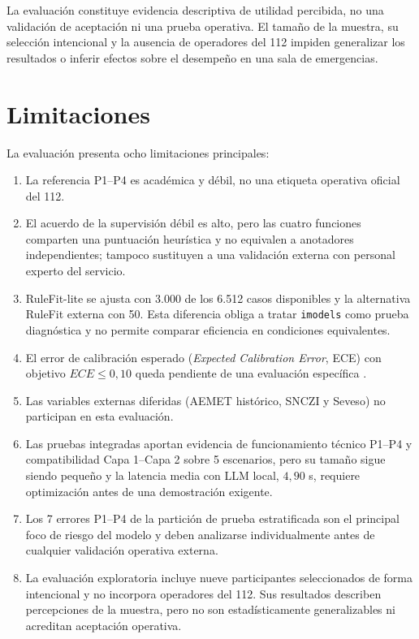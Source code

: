 La evaluación constituye evidencia descriptiva de utilidad percibida, no una validación
de aceptación ni una prueba operativa. El tamaño de la muestra, su selección intencional
y la ausencia de operadores del 112 impiden generalizar los resultados o inferir
efectos sobre el desempeño en una sala de emergencias.

\section{Limitaciones}

La evaluación presenta ocho limitaciones principales:

\begin{enumerate}
    \item La referencia P1--P4 es académica y débil, no una etiqueta operativa oficial
    del 112.
    \item El acuerdo de la supervisión débil es alto, pero las cuatro funciones comparten
    una puntuación heurística y no equivalen a anotadores independientes; tampoco sustituyen
    a una validación externa con personal experto del servicio.
    \item RuleFit-lite se ajusta con 3.000 de los 6.512 casos disponibles y la alternativa
    RuleFit externa con 50. Esta diferencia obliga a tratar \texttt{imodels} como prueba
    diagnóstica y no permite comparar eficiencia en condiciones equivalentes.
    \item El error de calibración esperado (\textit{Expected Calibration Error}, ECE)
    con objetivo \(ECE \leq 0{,}10\) queda pendiente de una evaluación específica
    \cite{Guo2017Calibration}.
    \item Las variables externas diferidas (AEMET histórico, SNCZI y Seveso)
    no participan en esta evaluación.
    \item Las pruebas integradas aportan evidencia de funcionamiento técnico P1--P4 y
    compatibilidad Capa 1--Capa 2 sobre 5 escenarios, pero su tamaño sigue siendo pequeño y la
    latencia media con LLM local, \(4{,}90\) s, requiere optimización antes de una
    demostración exigente.
    \item Los 7 errores P1--P4 de la partición de prueba estratificada son el principal foco de riesgo
    del modelo y deben analizarse individualmente antes de cualquier validación
    operativa externa.
    \item La evaluación exploratoria incluye nueve participantes seleccionados de forma
    intencional y no incorpora operadores del 112. Sus resultados describen percepciones
    de la muestra, pero no son estadísticamente generalizables ni acreditan aceptación
    operativa.
\end{enumerate}

